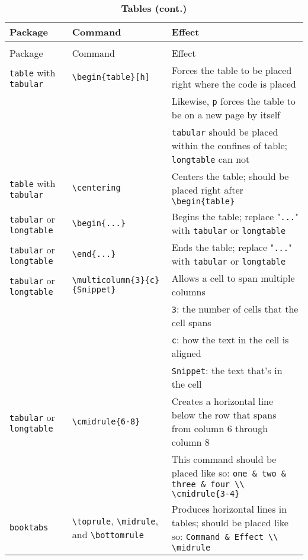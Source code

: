 \documentclass[10pt,letterpaper,landscape]{article}	%
\newcommand{\tabletitle}[1]{{\textbf{\large{#1}}}}
\begin{document}
\begin{longtable}{ @{} l l l @{} }
\caption{\tabletitle{Tables}} \\ \toprule
Package & Command & Effect \\ \midrule
\endfirsthead
\caption{\tabletitle{Tables (cont.)}} \\ \toprule
Package & Command & Effect \\ \midrule
\endhead
\lstinline!table! with \lstinline!tabular! & \lstinline!\begin{table}[h]! & Forces the table to be placed right where the code is placed \\
&& Likewise, \lstinline!p! forces the table to be on a new page by itself \\
&& \lstinline!tabular! should be placed within the confines of table; \lstinline!longtable! can not \\
\lstinline!table! with \lstinline!tabular! & \lstinline!\centering! & Centers the table; should be placed right after \lstinline!\begin{table}! \\
\lstinline!tabular! or \lstinline!longtable! & \lstinline!\begin{...}! & Begins the table; replace "\lstinline!...!" with \lstinline!tabular! or \lstinline!longtable! \\
\lstinline!tabular! or \lstinline!longtable! & \lstinline!\end{...}! & Ends the table; replace "\lstinline!...!" with \lstinline!tabular! or \lstinline!longtable! \\
\lstinline!tabular! or \lstinline!longtable! & \lstinline!\multicolumn{3}{c}{Snippet}! & Allows a cell to span multiple columns \\
&& \lstinline!3!: the number of cells that the cell spans \\
&& \lstinline!c!: how the text in the cell is aligned \\
&& \lstinline!Snippet!: the text that's in the cell \\
\lstinline!tabular! or \lstinline!longtable! & \lstinline!\cmidrule{6-8}! & Creates a horizontal line below the row that spans from column 6 through column 8 \\
&& This command should be placed like so: \lstinline!one & two & three & four \\ \cmidrule{3-4}! \\
\lstinline!booktabs! & \lstinline!\toprule!, \lstinline!\midrule!, and \lstinline!\bottomrule! & Produces horizontal lines in tables; should be placed like so: \lstinline!Command & Effect \\ \midrule! \\

\end{longtable}
\end{document}
